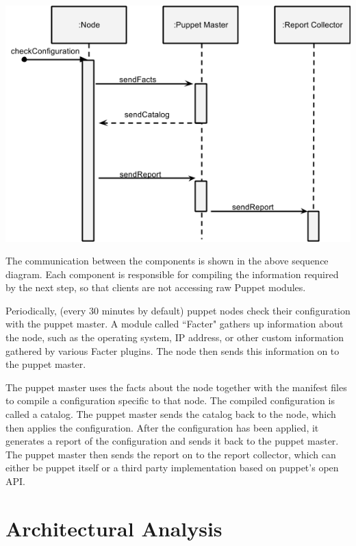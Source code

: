 \documentclass[a4paper]{article}
\begin{document}
\includegraphics[width=\textwidth]{images/sequence-diagram.png}

The communication between the components is shown in the above sequence diagram. Each component is responsible for compiling the information required by the next step, so that clients are not accessing raw Puppet modules.

Periodically, (every 30 minutes by default) puppet nodes check their configuration with the puppet master. A module called ``Facter" gathers up information about the node, such as the operating system, IP address, or other custom information gathered by various Facter plugins. The node then sends this information on to the puppet master.

The puppet master uses the facts about the node together with the manifest files to compile a configuration specific to that node. The compiled configuration is called a catalog. The puppet master sends the catalog back to the node, which then applies the configuration. After the configuration has been applied, it generates a report of the configuration and sends it back to the puppet master. The puppet master then sends the report on to the report collector, which can either be puppet itself or a third party implementation based on puppet’s open API.

\section{Architectural Analysis}

\end{document}
